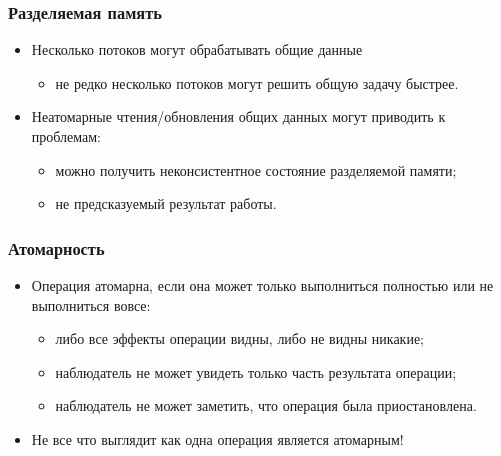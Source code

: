 \begin{frame}
\frametitle{Разделяемая память}
\begin{itemize}
  \item Несколько потоков могут обрабатывать общие данные
  \begin{itemize}
    \item не редко несколько потоков могут решить общую задачу быстрее.
  \end{itemize}
  \item Неатомарные чтения/обновления общих данных могут приводить к проблемам:
  \begin{itemize}
    \item можно получить неконсистентное состояние разделяемой памяти;
    \item не предсказуемый результат работы.
  \end{itemize}
\end{itemize}
\end{frame}

\begin{frame}
\frametitle{Атомарность}
\begin{itemize}
  \item Операция атомарна, если она может только выполниться полностью или не
  выполниться вовсе:
  \begin{itemize}
    \item либо все эффекты операции видны, либо не видны никакие;
    \item наблюдатель не может увидеть только часть результата операции;
    \item наблюдатель не может заметить, что операция была приостановлена.
  \end{itemize}
  \item Не все что выглядит как одна операция является атомарным!
\end{itemize}
\end{frame}

